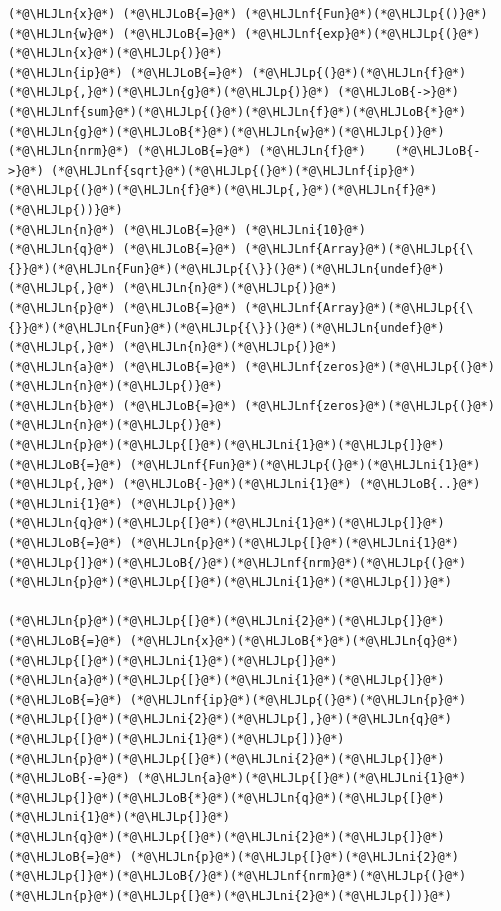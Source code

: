 \documentclass[12pt,a4paper]{article}
\newcommand{\HLJLn}[1]{#1}
\newcommand{\HLJLnf}[1]{\textcolor[RGB]{66,102,213}{#1}}
\newcommand{\HLJLni}[1]{\textcolor[RGB]{59,151,46}{#1}}
\newcommand{\HLJLoB}[1]{\textcolor[RGB]{102,102,102}{\textbf{#1}}}
\newcommand{\HLJLp}[1]{#1}
\begin{document}
\begin{lstlisting}
(*@\HLJLn{x}@*) (*@\HLJLoB{=}@*) (*@\HLJLnf{Fun}@*)(*@\HLJLp{()}@*)
(*@\HLJLn{w}@*) (*@\HLJLoB{=}@*) (*@\HLJLnf{exp}@*)(*@\HLJLp{(}@*)(*@\HLJLn{x}@*)(*@\HLJLp{)}@*)
(*@\HLJLn{ip}@*) (*@\HLJLoB{=}@*) (*@\HLJLp{(}@*)(*@\HLJLn{f}@*)(*@\HLJLp{,}@*)(*@\HLJLn{g}@*)(*@\HLJLp{)}@*) (*@\HLJLoB{->}@*) (*@\HLJLnf{sum}@*)(*@\HLJLp{(}@*)(*@\HLJLn{f}@*)(*@\HLJLoB{*}@*)(*@\HLJLn{g}@*)(*@\HLJLoB{*}@*)(*@\HLJLn{w}@*)(*@\HLJLp{)}@*)
(*@\HLJLn{nrm}@*) (*@\HLJLoB{=}@*) (*@\HLJLn{f}@*)    (*@\HLJLoB{->}@*) (*@\HLJLnf{sqrt}@*)(*@\HLJLp{(}@*)(*@\HLJLnf{ip}@*)(*@\HLJLp{(}@*)(*@\HLJLn{f}@*)(*@\HLJLp{,}@*)(*@\HLJLn{f}@*)(*@\HLJLp{))}@*)
(*@\HLJLn{n}@*) (*@\HLJLoB{=}@*) (*@\HLJLni{10}@*)
(*@\HLJLn{q}@*) (*@\HLJLoB{=}@*) (*@\HLJLnf{Array}@*)(*@\HLJLp{{\{}}@*)(*@\HLJLn{Fun}@*)(*@\HLJLp{{\}}(}@*)(*@\HLJLn{undef}@*)(*@\HLJLp{,}@*) (*@\HLJLn{n}@*)(*@\HLJLp{)}@*)
(*@\HLJLn{p}@*) (*@\HLJLoB{=}@*) (*@\HLJLnf{Array}@*)(*@\HLJLp{{\{}}@*)(*@\HLJLn{Fun}@*)(*@\HLJLp{{\}}(}@*)(*@\HLJLn{undef}@*)(*@\HLJLp{,}@*) (*@\HLJLn{n}@*)(*@\HLJLp{)}@*)
(*@\HLJLn{a}@*) (*@\HLJLoB{=}@*) (*@\HLJLnf{zeros}@*)(*@\HLJLp{(}@*)(*@\HLJLn{n}@*)(*@\HLJLp{)}@*)
(*@\HLJLn{b}@*) (*@\HLJLoB{=}@*) (*@\HLJLnf{zeros}@*)(*@\HLJLp{(}@*)(*@\HLJLn{n}@*)(*@\HLJLp{)}@*)
(*@\HLJLn{p}@*)(*@\HLJLp{[}@*)(*@\HLJLni{1}@*)(*@\HLJLp{]}@*) (*@\HLJLoB{=}@*) (*@\HLJLnf{Fun}@*)(*@\HLJLp{(}@*)(*@\HLJLni{1}@*)(*@\HLJLp{,}@*) (*@\HLJLoB{-}@*)(*@\HLJLni{1}@*) (*@\HLJLoB{..}@*) (*@\HLJLni{1}@*) (*@\HLJLp{)}@*)
(*@\HLJLn{q}@*)(*@\HLJLp{[}@*)(*@\HLJLni{1}@*)(*@\HLJLp{]}@*) (*@\HLJLoB{=}@*) (*@\HLJLn{p}@*)(*@\HLJLp{[}@*)(*@\HLJLni{1}@*)(*@\HLJLp{]}@*)(*@\HLJLoB{/}@*)(*@\HLJLnf{nrm}@*)(*@\HLJLp{(}@*)(*@\HLJLn{p}@*)(*@\HLJLp{[}@*)(*@\HLJLni{1}@*)(*@\HLJLp{])}@*)

(*@\HLJLn{p}@*)(*@\HLJLp{[}@*)(*@\HLJLni{2}@*)(*@\HLJLp{]}@*) (*@\HLJLoB{=}@*) (*@\HLJLn{x}@*)(*@\HLJLoB{*}@*)(*@\HLJLn{q}@*)(*@\HLJLp{[}@*)(*@\HLJLni{1}@*)(*@\HLJLp{]}@*)
(*@\HLJLn{a}@*)(*@\HLJLp{[}@*)(*@\HLJLni{1}@*)(*@\HLJLp{]}@*) (*@\HLJLoB{=}@*) (*@\HLJLnf{ip}@*)(*@\HLJLp{(}@*)(*@\HLJLn{p}@*)(*@\HLJLp{[}@*)(*@\HLJLni{2}@*)(*@\HLJLp{],}@*)(*@\HLJLn{q}@*)(*@\HLJLp{[}@*)(*@\HLJLni{1}@*)(*@\HLJLp{])}@*)
(*@\HLJLn{p}@*)(*@\HLJLp{[}@*)(*@\HLJLni{2}@*)(*@\HLJLp{]}@*) (*@\HLJLoB{-=}@*) (*@\HLJLn{a}@*)(*@\HLJLp{[}@*)(*@\HLJLni{1}@*)(*@\HLJLp{]}@*)(*@\HLJLoB{*}@*)(*@\HLJLn{q}@*)(*@\HLJLp{[}@*)(*@\HLJLni{1}@*)(*@\HLJLp{]}@*)
(*@\HLJLn{q}@*)(*@\HLJLp{[}@*)(*@\HLJLni{2}@*)(*@\HLJLp{]}@*) (*@\HLJLoB{=}@*) (*@\HLJLn{p}@*)(*@\HLJLp{[}@*)(*@\HLJLni{2}@*)(*@\HLJLp{]}@*)(*@\HLJLoB{/}@*)(*@\HLJLnf{nrm}@*)(*@\HLJLp{(}@*)(*@\HLJLn{p}@*)(*@\HLJLp{[}@*)(*@\HLJLni{2}@*)(*@\HLJLp{])}@*)


\end{lstlisting}
\end{document}
